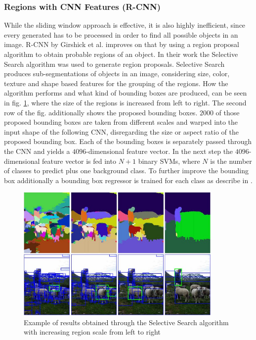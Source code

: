 \subsubsection{Regions with CNN Features (R-CNN)}
While the sliding window approach is effective, it is also highly inefficient, since every generated has to be processed in order to find all possible objects in an image.
\ac{R-CNN} by Girshick et al. \cite{rcnn} improves on that by using a region proposal algorithm to obtain probable regions of an object.
In their work the Selective Search algorithm \cite{selective_search} was used to generate region proposals.
Selective Search produces sub-segmentations of objects in an image, considering size, color, texture and shape based features for the grouping of the regions.
How the algorithm performs and what kind of bounding boxes are produced, can be seen in fig. \ref{fig:selective_search}, where the size of the regions is increased from left to right.
The second row of the fig. additionally shows the proposed bounding boxes.
$2000$ of those proposed bounding boxes are taken from different scales and warped into the input shape of the following \ac{CNN}, disregarding the size or aspect ratio of the proposed bounding box.
Each of the bounding boxes is separately passed through the \ac{CNN} and yields a $4096$-dimensional feature vector.
In the next step the $4096$-dimensional feature vector is fed into $N + 1$ binary \acp{SVM}, where $N$ is the number of classes to predict plus one background class.
To further improve the bounding box additionally a bounding box regressor is trained for each class as describe in \cite{bbox_regressor}.

\begin{figure}
\begin{center}
    \includegraphics[width=10cm]{imgs/selective_search.png}
    \caption{Example of results obtained through the Selective Search algorithm with increasing region scale from left to right \cite{selective_search}}
    \label{fig:selective_search}
\end{center}
\end{figure}


